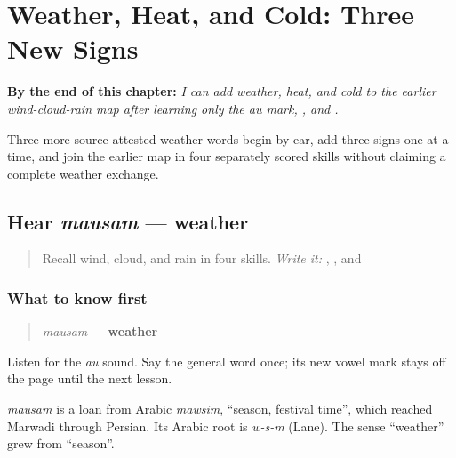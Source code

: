 
\chapter{Weather, Heat, and Cold: Three New Signs}
\label{ch:mw-weather-six}

\begin{chapteropening}
\textbf{By the end of this chapter:} \emph{I can add weather, heat, and cold to the earlier wind-cloud-rain map after learning only the au mark, , and .}

Three more source-attested weather words begin by ear, add three signs one at a time, and join the earlier map in four separately scored skills without claiming a complete weather exchange.
\end{chapteropening}

\section[mausam]{Hear \emph{mausam} — weather}

\label{lesson:MW-C12-hear-mausam}



\begin{quote}
Recall wind, cloud, and rain in four skills. \emph{Write it:} \textbf{}, \textbf{}, and \textbf{}
\end{quote}

\subsection*{What to know first}
\begin{quote}
\emph{mausam} — \textbf{weather}
\end{quote}

Listen for the \emph{au} sound. Say the general word once; its new vowel mark stays off the page until the next lesson.

\begin{cousinweb}
\emph{mausam} is a loan from Arabic \emph{mawsim}, \textquotedblleft{}season, festival time\textquotedblright{}, which reached Marwadi through Persian. Its Arabic root is \emph{w-s-m} (Lane). The sense \textquotedblleft{}weather\textquotedblright{} grew from \textquotedblleft{}season\textquotedblright{}.
\end{cousinweb}

